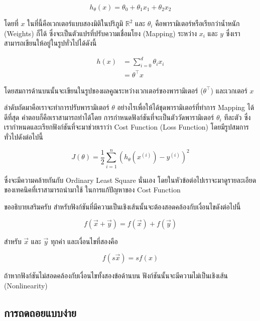 \begin{equation}
    h_\theta(x) = \theta_0 + \theta_1 x_1 + \theta_2 x_2
\end{equation}

\noindent โดยที่ $x$ ในที่นี้คือเวกเตอร์แบบสองมิติในปริภูมิ $\mathbb{R}^{2}$ และ $\theta_{i}$ คือพารามิเตอร์หรือเรียกว่าน้ำหนัก 
(Weights) ก็ได้ ซึ่งจะเป็นตัวแปรที่ปรับความเชื่อมโยง (Mapping) ระหว่าง $x_{i}$ และ $y$ ซึ่งเราสามารถเขียนให้อยู่ในรูปทั่วไปได้ดังนี้

\begin{align}
    h(x) &= \sum_{i=0}^{d} \theta_{i} x_{i} \\
         &= \theta^{\top} x
\end{align}

\noindent โดยสมการด้านบนนั้นจะเขียนในรูปของผลคูณระหว่างเวกเตอร์ของพารามิเตอร์ ($\theta^{\top}$) และเวกเตอร์ $x$

ลำดับถัดมาคือเราจะทำการปรับพารามิเตอร์ $\theta$ อย่างไรเพื่อให้ได้ชุดพารามิเตอร์ที่ทำการ Mapping ได้ดีที่สุด คำตอบก็คือเราสามารถทำได้โดย%
การกำหนดฟังก์ชันที่จะเป็นตัววัดพารามิเตอร์ $\theta_{i}$ ทีละตัว ซึ่งเรากำหนดและเรียกฟังก์ชันที่จะมาช่วยเราว่า Cost Function (Loss Function)
โดยมีรูปสมการทั่วไปดังต่อไปนี้ 

\begin{equation}
    J(\theta) = \frac 1 2 \sum_{i=1}^n \left( h_\theta(x^{(i)}) - y^{(i)} \right)^2
\end{equation}

\noindent ซึ่งจะมีความคล้ายกันกับ Ordinary Least Square นั่นเอง โดยในหัวข้อต่อไปเราจะมาดูรายละเอียดของเทคนิคที่เราสามารถนำมาใช้%
ในการแก้ปัญหาของ Cost Function

\noindent ขออธิบายเสริมครับ สำหรับฟังก์ชันที่มีความเป็นเชิงเส้นนั้นจะต้องสอดคล้องกับเงื่อนไขดังต่อไปนี้

\begin{equation}
    f(\vec{x} + \vec{y}) = f(\vec{x}) + f(\vec{y})
\end{equation}

\noindent สำหรับ $\vec{x}$ และ $\vec{y}$ ทุกค่า และเงื่อนไขที่สองคือ

\begin{equation}
    f(s\vec{x}) = sf(x)
\end{equation}

\noindent ถ้าหากฟังก์ชันไม่สอดคล้องกับเงื่อนไขทั้งสองข้อด้านบน ฟังก์ชันนั้นจะมีความไม่เป็นเชิงเส้น (Nonlinearity)

\subsection{การถดถอยแบบง่าย}
\label{ssec:simple_lin_res}

